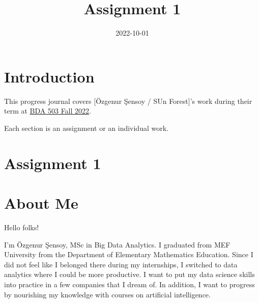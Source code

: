 \documentclass[
  letterpaper,
  DIV=11,
  numbers=noendperiod]{scrreprt}
\title{Assignment 1}
\author{}
\date{2022-10-01}
\renewcommand*\contentsname{Table of contents}
\newcommand\contentsname{Table of contents}
\begin{document}
\maketitle
\ifdefined\Shaded\renewenvironment{Shaded}{\begin{tcolorbox}[interior hidden, boxrule=0pt, sharp corners, borderline west={3pt}{0pt}{shadecolor}, frame hidden, enhanced, breakable]}{\end{tcolorbox}}\fi

\renewcommand*\contentsname{Table of contents}
{
\hypersetup{linkcolor=}
\setcounter{tocdepth}{2}
\tableofcontents
}

\hypertarget{introduction}{%
\chapter*{Introduction}\label{introduction}}


This progress journal covers {[}Özgenur Şensoy / SUn Forest{]}'s work
during their term at \href{https://mef-bda503.github.io/fall22/}{BDA 503
Fall 2022}.

Each section is an assignment or an individual work.


\hypertarget{assignment-1}{%
\chapter{Assignment 1}\label{assignment-1}}


\hypertarget{about-me}{%
\chapter{\textbar{} About Me}\label{about-me}}

{Hello folks!}

I'm Özgenur Şensoy, MSc in Big Data Analytics. I graduated from MEF
University from the Department of Elementary Mathematics Education.
Since I did not feel like I belonged there during my internships, I
switched to data analytics where I could be more productive. I want to
put my data science skills into practice in a few companies that I dream
of. In addition, I want to progress by nourishing my knowledge with
courses on artificial intelligence.
\end{document}
